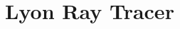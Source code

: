 \documentclass[a4paper]{article}
\title{Lyon Ray Tracer}
\begin{document}
\maketitle













\newpage
\glsaddall
\printglossaries

\vfill
\tableofcontents
\end{document}
